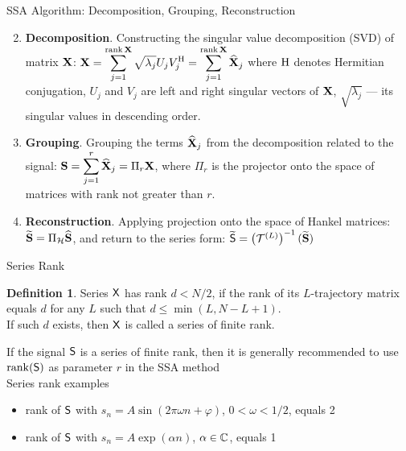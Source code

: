 \documentclass[pdf, unicode, ucs, notheorems]{beamer}
\theoremstyle{definition}
\newtheorem{definition}{Definition}
\begin{document}
\begin{frame}{SSA Algorithm: Decomposition, Grouping, Reconstruction}
  \begin{enumerate}
      \setcounter{enumi}{1}
    \item \textbf{Decomposition}.
      Constructing the singular value decomposition (SVD) of matrix $\mathbf{X}$:
      $\displaystyle \mathbf{X} = \sum_{j=1}^{\operatorname{rank}\mathbf{X}}
      \sqrt{\lambda_j} U_j V_j^{\mathrm{H}} =
      \sum_{j=1}^{\operatorname{rank}\mathbf{X}} \widehat{\mathbf{X}}_j$
      where $\mathrm{H}$ denotes Hermitian
      conjugation, $U_j$ and $V_j$ are left and right singular vectors
      of $\mathbf{X}$, $\sqrt{\lambda_j}$ --- its singular values in
      descending order.
      \vspace{0.2cm}\\
    \item \textbf{Grouping}. Grouping the terms $\widehat{\mathbf{X}}_j$
      from the decomposition related to the signal:
      $\displaystyle \mathbf{S} = \sum_{j=1}^{r}\widehat{\mathbf{X}}_j = \Pi_r \mathbf{X}$,
      where $\Pi_r$ is the projector onto the space of matrices with
      rank not greater than $r$.
      \vspace{0.2cm}
    \item \textbf{Reconstruction}. Applying projection onto the
      space of Hankel
      matrices: $\widetilde{\mathbf{S}}= \Pi_{\mathcal{H}}\widehat{\mathbf{S}}$,
      and return to the series form: $\widetilde{\mathsf{S}}=
      \left(\mathcal{T}^{(L)}\right)^{-1}(\widetilde{\mathbf{S}})$
  \end{enumerate}
\end{frame}

\begin{frame}{Series Rank}
  \begin{definition}
    Series $\mathsf{X}$ has rank $d < N/2$, if the rank of its $L$-trajectory
    matrix equals $d$ for any $L$ such that $d \leqslant \min(L,
    N - L + 1)$.\\
    If such $d$ exists, then $\mathsf{X}$ is called a series of finite rank.
  \end{definition}
  \vspace{0.5cm}
  If the signal $\mathsf{S}$ is a series of finite rank, then it is
  generally recommended to use $\operatorname{rank}(\mathsf{S})$ as
  parameter $r$ in the SSA method
  \vspace{0.4cm}\\
  Series rank examples
  \begin{itemize}
    \item rank of $\mathsf{S}$ with $s_n = A\sin(2\pi \omega n + \varphi)$,
      $0 < \omega < 1/2$, equals 2
    \item rank of $\mathsf{S}$ with $s_n = A \exp(\alpha n)$, $\alpha
      \in\mathbb{C}$, equals 1
  \end{itemize}
\end{frame}
\end{document}
